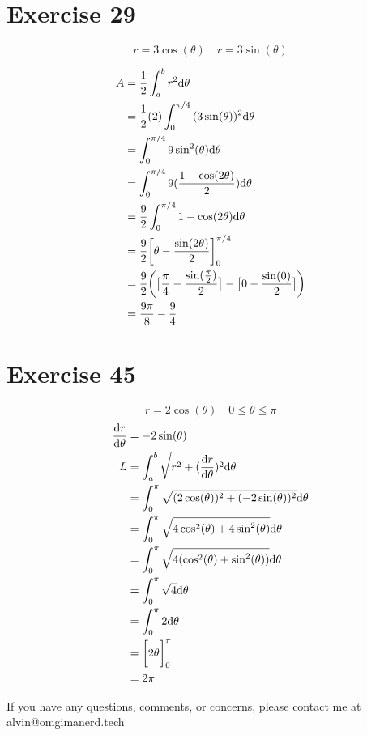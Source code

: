 \documentclass[letterpaper, 12pt]{math}
\begin{document}
\section*{Exercise 29}
\[ r = 3\cos(\theta) \quad r = 3\sin(\theta) \]
\begin{center}
\end{center}
\begin{align*}
  A &= \frac{1}{2}\int_{a}^{b}{r^{2}\mathrm{d}{\theta}} \\
  &= \frac{1}{2}(2)\int_{0}^{\pi/4}{(3\sin(\theta))^{2}\mathrm{d}{\theta}} \\
  &= \int_{0}^{\pi/4}{9\sin^{2}(\theta)\mathrm{d}{\theta}} \\
  &= \int_{0}^{\pi/4}{9(\frac{1-\cos(2\theta)}{2})\mathrm{d}{\theta}} \\
  &= \frac{9}{2}\int_{0}^{\pi/4}{1-\cos(2\theta)\mathrm{d}{\theta}} \\
  &= \frac{9}{2}\bigg[\theta-\frac{\sin(2\theta)}{2}\bigg]_{0}^{\pi/4} \\
  &= \frac{9}{2}\bigg(\big[\frac{\pi}{4}-\frac{\sin(\frac{\pi}{2})}{2}\big]-
    \big[0-\frac{\sin(0)}{2}\big]\bigg) \\
  &= \frac{9\pi}{8}-\frac{9}{4}
\end{align*}

\section*{Exercise 45}
\[ r = 2\cos(\theta) \quad 0 \leq \theta \leq \pi \]
\begin{align*}
  \frac{\mathrm{d}{r}}{\mathrm{d}{\theta}} &= -2\sin(\theta) \\
  L &= \int_{a}^{b}{\sqrt{r^{2}+(\frac{\mathrm{d}{r}}{\mathrm{d}{\theta}})^{2}}\mathrm{d}{\theta}} \\
  &= \int_{0}^{\pi}
    {\sqrt{(2\cos(\theta))^{2}+(-2\sin(\theta))^{2}}\mathrm{d}{\theta}} \\
  &= \int_{0}^{\pi}
    {\sqrt{4\cos^{2}(\theta)+4\sin^{2}(\theta)}\mathrm{d}{\theta}} \\
  &= \int_{0}^{\pi}
    {\sqrt{4(\cos^{2}(\theta)+\sin^{2}(\theta))}\mathrm{d}{\theta}} \\
  &= \int_{0}^{\pi}{\sqrt{4}\mathrm{d}{\theta}} \\
  &= \int_{0}^{\pi}{2\mathrm{d}{\theta}} \\
  &= \bigg[2\theta\bigg]_{0}^{\pi} \\
  &= 2\pi
\end{align*}

\begin{center}
  If you have any questions, comments, or concerns, please contact me at
  alvin@omgimanerd.tech
\end{center}
\end{document}
